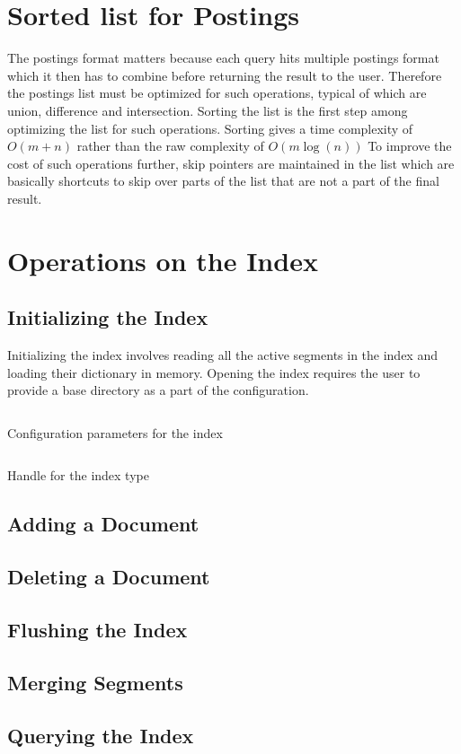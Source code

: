 \section{Sorted list for Postings}
The postings format matters because each query hits multiple postings format which it then has to combine before returning the result to the user.
Therefore the postings list must be optimized for such operations, typical of which are union, difference and intersection.
Sorting the list is the first step among optimizing the list for such operations.
Sorting gives a time complexity of $O(m+n)$ rather than the raw complexity of $O(m \log(n))$
To improve the cost of such operations further, skip pointers are maintained in the list which are basically shortcuts to skip over parts of the list
that are not a part of the final result.

\section{Operations on the Index}

\subsection{Initializing the Index}
Initializing the index involves reading all the active segments in the index and loading their dictionary in memory.
Opening the index requires the user to provide a base directory as a part of the configuration.
\begin{listing}
\inputminted{haskell}{hs/hconfig.hs}
\caption{Configuration parameters for the index}
\end{listing}

\begin{listing}
\inputminted{haskell}{hs/hindex.hs}
\caption{Handle for the index type}
\end{listing}


\subsection{Adding a Document}

\subsection{Deleting a Document}

\subsection{Flushing the Index}

\subsection{Merging Segments}

\subsection{Querying the Index}

